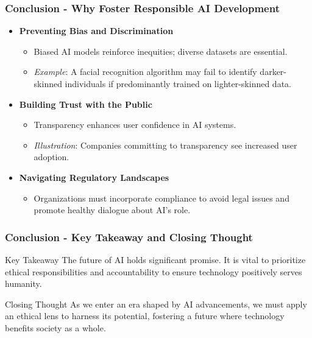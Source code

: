 \documentclass[aspectratio=169]{beamer}
\begin{document}
\begin{frame}[fragile]
    \frametitle{Conclusion - Why Foster Responsible AI Development}
    \begin{itemize}
        \item \textbf{Preventing Bias and Discrimination}
        \begin{itemize}
            \item Biased AI models reinforce inequities; diverse datasets are essential.
            \item \textit{Example}: A facial recognition algorithm may fail to identify darker-skinned individuals if predominantly trained on lighter-skinned data.
        \end{itemize}
        
        \item \textbf{Building Trust with the Public} 
        \begin{itemize}
            \item Transparency enhances user confidence in AI systems.
            \item \textit{Illustration}: Companies committing to transparency see increased user adoption.
        \end{itemize}
        
        \item \textbf{Navigating Regulatory Landscapes} 
        \begin{itemize}
            \item Organizations must incorporate compliance to avoid legal issues and promote healthy dialogue about AI's role.
        \end{itemize}
    \end{itemize}
\end{frame}

\begin{frame}[fragile]
    \frametitle{Conclusion - Key Takeaway and Closing Thought}
    \begin{block}{Key Takeaway}
        The future of AI holds significant promise. It is vital to prioritize ethical responsibilities and accountability to ensure technology positively serves humanity.
    \end{block}
    
    \begin{block}{Closing Thought}
        As we enter an era shaped by AI advancements, we must apply an ethical lens to harness its potential, fostering a future where technology benefits society as a whole.
    \end{block}
\end{frame}
\end{document}
